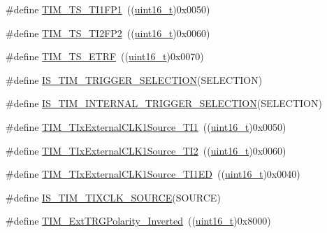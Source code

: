 \begin{DoxyCompactItemize}
\item 
\#define \hyperlink{group___t_i_m___internal___trigger___selection_ga38d3514d54bcdb0ea8ac8bd91c5832b5}{T\+I\+M\+\_\+\+T\+S\+\_\+\+T\+I1\+F\+P1}~((\hyperlink{_p_e___types_8h_a1f1825b69244eb3ad2c7165ddc99c956}{uint16\+\_\+t})0x0050)
\item 
\#define \hyperlink{group___t_i_m___internal___trigger___selection_ga0ed58a269bccd3f22d19cc9a2ba3123f}{T\+I\+M\+\_\+\+T\+S\+\_\+\+T\+I2\+F\+P2}~((\hyperlink{_p_e___types_8h_a1f1825b69244eb3ad2c7165ddc99c956}{uint16\+\_\+t})0x0060)
\item 
\#define \hyperlink{group___t_i_m___internal___trigger___selection_gaece08e02e056613a882aa7ff0a6ccc2d}{T\+I\+M\+\_\+\+T\+S\+\_\+\+E\+T\+RF}~((\hyperlink{_p_e___types_8h_a1f1825b69244eb3ad2c7165ddc99c956}{uint16\+\_\+t})0x0070)
\item 
\#define \hyperlink{group___t_i_m___internal___trigger___selection_ga36e47cf625c695a368a68280e950dfbc}{I\+S\+\_\+\+T\+I\+M\+\_\+\+T\+R\+I\+G\+G\+E\+R\+\_\+\+S\+E\+L\+E\+C\+T\+I\+ON}(S\+E\+L\+E\+C\+T\+I\+ON)
\item 
\#define \hyperlink{group___t_i_m___internal___trigger___selection_ga1ce6c387021e2fdaf3fa3d7cd3eae962}{I\+S\+\_\+\+T\+I\+M\+\_\+\+I\+N\+T\+E\+R\+N\+A\+L\+\_\+\+T\+R\+I\+G\+G\+E\+R\+\_\+\+S\+E\+L\+E\+C\+T\+I\+ON}(S\+E\+L\+E\+C\+T\+I\+ON)
\item 
\#define \hyperlink{group___t_i_m___t_ix___external___clock___source_ga237daecde6e1f75509acc80a9ccce820}{T\+I\+M\+\_\+\+T\+Ix\+External\+C\+L\+K1\+Source\+\_\+\+T\+I1}~((\hyperlink{_p_e___types_8h_a1f1825b69244eb3ad2c7165ddc99c956}{uint16\+\_\+t})0x0050)
\item 
\#define \hyperlink{group___t_i_m___t_ix___external___clock___source_gafa3c6345a7e1c3668b2e7e4d61a79491}{T\+I\+M\+\_\+\+T\+Ix\+External\+C\+L\+K1\+Source\+\_\+\+T\+I2}~((\hyperlink{_p_e___types_8h_a1f1825b69244eb3ad2c7165ddc99c956}{uint16\+\_\+t})0x0060)
\item 
\#define \hyperlink{group___t_i_m___t_ix___external___clock___source_gaa1a749bc38d434902b69a45d50ee0889}{T\+I\+M\+\_\+\+T\+Ix\+External\+C\+L\+K1\+Source\+\_\+\+T\+I1\+ED}~((\hyperlink{_p_e___types_8h_a1f1825b69244eb3ad2c7165ddc99c956}{uint16\+\_\+t})0x0040)
\item 
\#define \hyperlink{group___t_i_m___t_ix___external___clock___source_gabfa9cd6cf6e9df4bff8d6cdf16c6b374}{I\+S\+\_\+\+T\+I\+M\+\_\+\+T\+I\+X\+C\+L\+K\+\_\+\+S\+O\+U\+R\+CE}(S\+O\+U\+R\+CE)
\item 
\#define \hyperlink{group___t_i_m___external___trigger___polarity_ga96f3959a02c0491ab8d65cfa384ce7e3}{T\+I\+M\+\_\+\+Ext\+T\+R\+G\+Polarity\+\_\+\+Inverted}~((\hyperlink{_p_e___types_8h_a1f1825b69244eb3ad2c7165ddc99c956}{uint16\+\_\+t})0x8000)

\end{DoxyCompactItemize}
